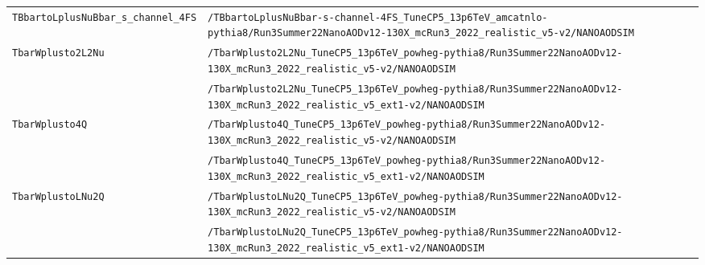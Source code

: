 \begin{longtable}{@{}>{\RaggedRight\arraybackslash}p{} >{\RaggedRight\arraybackslash}p{}@{}}
\addlinespace[2pt]
\texttt{TBbartoLplusNuBbar\_\allowbreak{}s\_\allowbreak{}channel\_\allowbreak{}4FS} & \texttt{/\allowbreak{}TBbartoLplusNuBbar-\allowbreak{}s-\allowbreak{}channel-\allowbreak{}4FS\_\allowbreak{}TuneCP5\_\allowbreak{}13p6TeV\_\allowbreak{}amcatnlo-\allowbreak{}pythia8/\allowbreak{}Run3Summer22NanoAODv12-\allowbreak{}130X\_\allowbreak{}mcRun3\_\allowbreak{}2022\_\allowbreak{}realistic\_\allowbreak{}v5-\allowbreak{}v2/\allowbreak{}NANOAODSIM} \\
\addlinespace[2pt]
\texttt{TbarWplusto2L2Nu} & \texttt{/\allowbreak{}TbarWplusto2L2Nu\_\allowbreak{}TuneCP5\_\allowbreak{}13p6TeV\_\allowbreak{}powheg-\allowbreak{}pythia8/\allowbreak{}Run3Summer22NanoAODv12-\allowbreak{}130X\_\allowbreak{}mcRun3\_\allowbreak{}2022\_\allowbreak{}realistic\_\allowbreak{}v5-\allowbreak{}v2/\allowbreak{}NANOAODSIM} \\
 & \texttt{/\allowbreak{}TbarWplusto2L2Nu\_\allowbreak{}TuneCP5\_\allowbreak{}13p6TeV\_\allowbreak{}powheg-\allowbreak{}pythia8/\allowbreak{}Run3Summer22NanoAODv12-\allowbreak{}130X\_\allowbreak{}mcRun3\_\allowbreak{}2022\_\allowbreak{}realistic\_\allowbreak{}v5\_\allowbreak{}ext1-\allowbreak{}v2/\allowbreak{}NANOAODSIM} \\
\addlinespace[2pt]
\texttt{TbarWplusto4Q} & \texttt{/\allowbreak{}TbarWplusto4Q\_\allowbreak{}TuneCP5\_\allowbreak{}13p6TeV\_\allowbreak{}powheg-\allowbreak{}pythia8/\allowbreak{}Run3Summer22NanoAODv12-\allowbreak{}130X\_\allowbreak{}mcRun3\_\allowbreak{}2022\_\allowbreak{}realistic\_\allowbreak{}v5-\allowbreak{}v2/\allowbreak{}NANOAODSIM} \\
 & \texttt{/\allowbreak{}TbarWplusto4Q\_\allowbreak{}TuneCP5\_\allowbreak{}13p6TeV\_\allowbreak{}powheg-\allowbreak{}pythia8/\allowbreak{}Run3Summer22NanoAODv12-\allowbreak{}130X\_\allowbreak{}mcRun3\_\allowbreak{}2022\_\allowbreak{}realistic\_\allowbreak{}v5\_\allowbreak{}ext1-\allowbreak{}v2/\allowbreak{}NANOAODSIM} \\
\addlinespace[2pt]
\texttt{TbarWplustoLNu2Q} & \texttt{/\allowbreak{}TbarWplustoLNu2Q\_\allowbreak{}TuneCP5\_\allowbreak{}13p6TeV\_\allowbreak{}powheg-\allowbreak{}pythia8/\allowbreak{}Run3Summer22NanoAODv12-\allowbreak{}130X\_\allowbreak{}mcRun3\_\allowbreak{}2022\_\allowbreak{}realistic\_\allowbreak{}v5-\allowbreak{}v2/\allowbreak{}NANOAODSIM} \\
 & \texttt{/\allowbreak{}TbarWplustoLNu2Q\_\allowbreak{}TuneCP5\_\allowbreak{}13p6TeV\_\allowbreak{}powheg-\allowbreak{}pythia8/\allowbreak{}Run3Summer22NanoAODv12-\allowbreak{}130X\_\allowbreak{}mcRun3\_\allowbreak{}2022\_\allowbreak{}realistic\_\allowbreak{}v5\_\allowbreak{}ext1-\allowbreak{}v2/\allowbreak{}NANOAODSIM} \\

\end{longtable}
